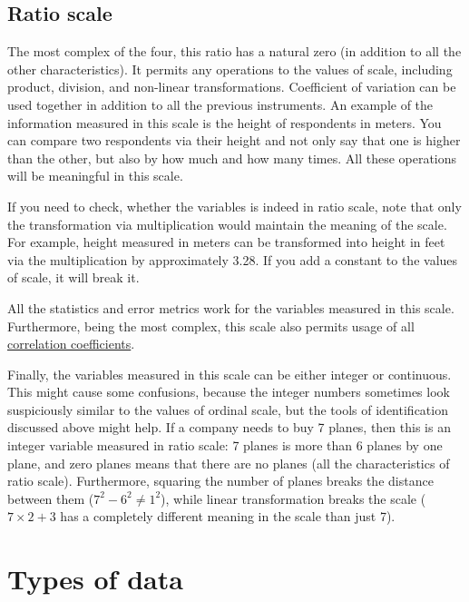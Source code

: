 \documentclass[
]{book}
\theoremstyle{definition}
\theoremstyle{definition}
\theoremstyle{definition}
\theoremstyle{definition}
\theoremstyle{remark}
\begin{document}
\hypertarget{ratio-scale}{%
\subsection{Ratio scale}\label{ratio-scale}}

The most complex of the four, this ratio has a natural zero (in addition to all the other characteristics). It permits any operations to the values of scale, including product, division, and non-linear transformations. Coefficient of variation can be used together in addition to all the previous instruments. An example of the information measured in this scale is the height of respondents in meters. You can compare two respondents via their height and not only say that one is higher than the other, but also by how much and how many times. All these operations will be meaningful in this scale.

If you need to check, whether the variables is indeed in ratio scale, note that only the transformation via multiplication would maintain the meaning of the scale. For example, height measured in meters can be transformed into height in feet via the multiplication by approximately 3.28. If you add a constant to the values of scale, it will break it.

All the statistics and error metrics work for the variables measured in this scale. Furthermore, being the most complex, this scale also permits usage of all \protect\hyperlink{correlations}{correlation coefficients}.

Finally, the variables measured in this scale can be either integer or continuous. This might cause some confusions, because the integer numbers sometimes look suspiciously similar to the values of ordinal scale, but the tools of identification discussed above might help. If a company needs to buy 7 planes, then this is an integer variable measured in ratio scale: 7 planes is more than 6 planes by one plane, and zero planes means that there are no planes (all the characteristics of ratio scale). Furthermore, squaring the number of planes breaks the distance between them (\(7^2 - 6^2 \neq 1^2\)), while linear transformation breaks the scale (\(7\times 2 + 3\) has a completely different meaning in the scale than just 7).

\hypertarget{typesOfData}{%
\section{Types of data}\label{typesOfData}}
\end{document}
